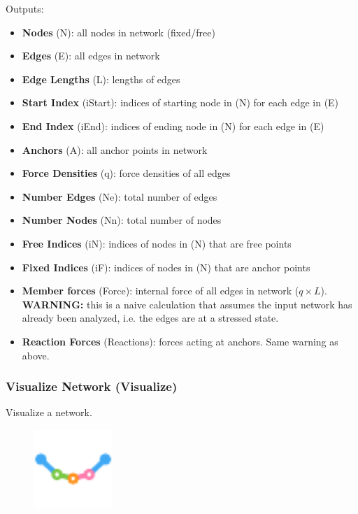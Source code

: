 Outputs:
\begin{itemize}
    \setlength\itemsep{0.05em}
    \item \textbf{Nodes} (N): all nodes in network (fixed/free)
    \item \textbf{Edges} (E): all edges in network
    \item \textbf{Edge Lengths} (L): lengths of edges
    \item \textbf{Start Index} (iStart): indices of starting node in (N) for each edge in (E)
    \item \textbf{End Index} (iEnd): indices of ending node in (N) for each edge in (E)
    \item \textbf{Anchors} (A): all anchor points in network
    \item \textbf{Force Densities} (q): force densities of all edges
    \item \textbf{Number Edges} (Ne): total number of edges
    \item \textbf{Number Nodes} (Nn): total number of nodes
    \item \textbf{Free Indices} (iN): indices of nodes in (N) that are free points
    \item \textbf{Fixed Indices} (iF): indices of nodes in (N) that are anchor points
    \item \textbf{Member forces} (Force): internal force of all edges in network ($q\times L$). {\color{kpink} \textbf{WARNING:} this is a naive calculation that assumes the input network has already been analyzed, i.e. the edges are at a stressed state.}
    \item \textbf{Reaction Forces} (Reactions): forces acting at anchors. Same warning as above.
\end{itemize}

\subsubsection{Visualize Network (Visualize)}\label{Visualize}
Visualize a network.

\begin{figure}[h]
    \centering
    \includegraphics[width = 3cm]{Figures/visualize}
\end{figure}

